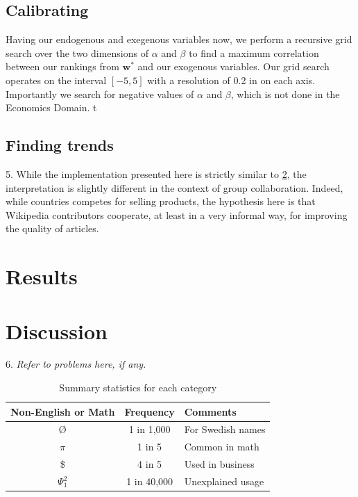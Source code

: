\documentclass{acm_proc_article-sp}
\begin{document}
\subsection{Calibrating}

Having our endogenous and exegenous variables now, we perform a recursive grid search over the two dimensions of $\alpha$ and $\beta$ to find a maximum correlation between our rankings from $\mathbf{w^*}$ and our exogenous variables. Our grid search operates on the interval $[-5,5]$ with a resolution of 0.2 in on each axis. Importantly we search for negative values of $\alpha$ and $\beta$, which is not done in the Economics Domain. t

\subsection{Finding trends}

5. While the implementation presented here is strictly similar to \ref{}, the interpretation is slightly different in the context of group collaboration. Indeed, while countries competes for selling products, the hypothesis here is that Wikipedia contributors cooperate, at least in a very informal way, for improving the quality of articles.

\section{Results}

\section{Discussion}

6. {\it Refer to problems here, if any.}

\begin{table}
\centering
\caption{Summary statistics for each category}
\begin{tabular}{|c|c|l|} \hline
Non-English or Math&Frequency&Comments\\ \hline
\O & 1 in 1,000& For Swedish names\\ \hline
$\pi$ & 1 in 5& Common in math\\ \hline
\$ & 4 in 5 & Used in business\\ \hline
$\Psi^2_1$ & 1 in 40,000& Unexplained usage\\
\hline\end{tabular}
\label{tab:statistics}
\end{table}
\end{document}
